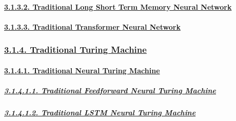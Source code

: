 \documentclass[
]{article}
\begin{document}
\hypertarget{traditional-long-short-term-memory-neural-network}{%
\paragraph{\texorpdfstring{\protect\hyperlink{traditional-long-short-term-memory-neural-network-1}{3.1.3.2.
Traditional Long Short Term Memory Neural
Network}}{3.1.3.2. Traditional Long Short Term Memory Neural Network}}\label{traditional-long-short-term-memory-neural-network}}

\hypertarget{traditional-transformer-neural-network}{%
\paragraph{\texorpdfstring{\protect\hyperlink{traditional-transformer-neural-network-1}{3.1.3.3.
Traditional Transformer Neural
Network}}{3.1.3.3. Traditional Transformer Neural Network}}\label{traditional-transformer-neural-network}}

\hypertarget{traditional-turing-machine}{%
\subsubsection{\texorpdfstring{\protect\hyperlink{traditional-turing-machine-1}{3.1.4.
Traditional Turing
Machine}}{3.1.4. Traditional Turing Machine}}\label{traditional-turing-machine}}

\hypertarget{traditional-neural-turing-machine}{%
\paragraph{\texorpdfstring{\protect\hyperlink{traditional-neural-turing-machine-1}{3.1.4.1.
Traditional Neural Turing
Machine}}{3.1.4.1. Traditional Neural Turing Machine}}\label{traditional-neural-turing-machine}}

\hypertarget{traditional-feedforward-neural-turing-machine}{%
\subparagraph{\texorpdfstring{\protect\hyperlink{traditional-feedforward-neural-turing-machine-1}{3.1.4.1.1.
Traditional Feedforward Neural Turing
Machine}}{3.1.4.1.1. Traditional Feedforward Neural Turing Machine}}\label{traditional-feedforward-neural-turing-machine}}

\hypertarget{traditional-lstm-neural-turing-machine}{%
\subparagraph{\texorpdfstring{\protect\hyperlink{traditional-lstm-neural-turing-machine-1}{3.1.4.1.2.
Traditional LSTM Neural Turing
Machine}}{3.1.4.1.2. Traditional LSTM Neural Turing Machine}}\label{traditional-lstm-neural-turing-machine}}
\end{document}
